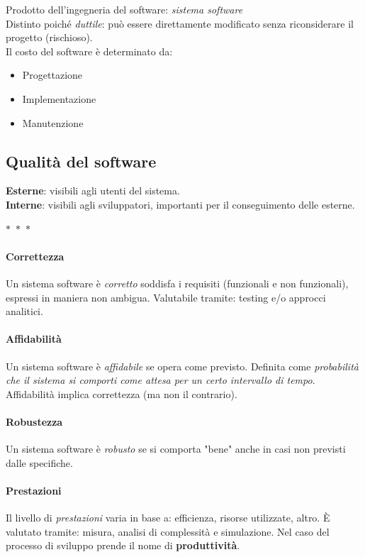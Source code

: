 Prodotto dell'ingegneria del software: \textit{sistema software}
\\
Distinto poiché \textit{duttile}: può essere direttamente modificato senza riconsiderare il progetto (rischioso).
\\
Il costo del software è determinato da:
\begin{itemize}
    \item Progettazione
    \item Implementazione
    \item Manutenzione
\end{itemize}

\subsection{Qualità del software}

\textbf{Esterne}: visibili agli utenti del sistema.\\
\textbf{Interne}: visibili agli sviluppatori, importanti per il conseguimento delle esterne.

\begin{center}
  $\ast$~$\ast$~$\ast$
\end{center}

\paragraph{Correttezza} Un sistema software è \textit{corretto} soddisfa i requisiti (funzionali e non funzionali), espressi in maniera non ambigua. Valutabile tramite: testing e/o approcci analitici.

\paragraph{Affidabilità} Un sistema software è \textit{affidabile} se opera come previsto. Definita come \textit{probabilità che il sistema si comporti come attesa per un certo intervallo di tempo}. Affidabilità implica correttezza (ma non il contrario).

\paragraph{Robustezza} Un sistema software è \textit{robusto} se si comporta "bene" anche in casi non previsti dalle specifiche.

\paragraph{Prestazioni} Il livello di \textit{prestazioni} varia in base a: efficienza, risorse utilizzate, altro. È valutato tramite: misura, analisi di complessità e simulazione. Nel caso del processo di sviluppo prende il nome di \textbf{produttività}.

